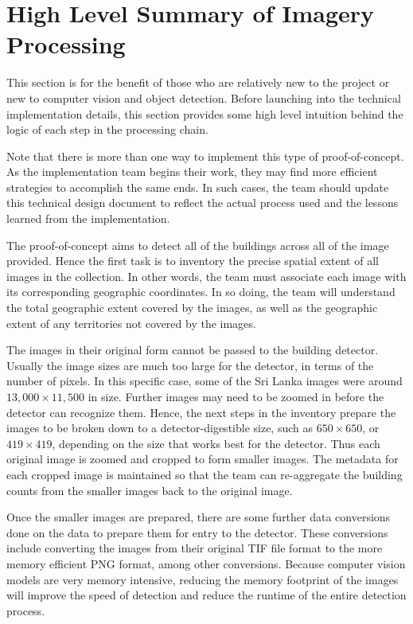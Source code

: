 \documentclass[12pt, a4paper, oneside, headinclude, footinclude]{article}
\begin{document}
\section{High Level Summary of Imagery Processing}
This section is for the benefit of those who are relatively new to the project
or new to computer vision and object detection. Before launching into the
technical implementation details, this section provides some high level
intuition behind the logic of each step in the processing chain.

Note that there is more than one way to implement this type of proof-of-concept.
As the implementation team begins their work, they may find more efficient
strategies to accomplish the same ends. In such cases, the team should update
this technical design document to reflect the actual process used and the
lessons learned from the implementation.

The proof-of-concept aims to detect all of the buildings across all of the image
provided. Hence the first task is to inventory the precise spatial extent of all
images in the collection. In other words, the team must associate each image
with its corresponding geographic coordinates. In so doing, the team will
understand the total geographic extent covered by the images, as well as the
geographic extent of any territories not covered by the images. 

The images in their original form cannot be passed to the building detector.
Usually the image sizes are much too large for the detector, in terms of the
number of pixels.  In this specific case, some of the Sri Lanka images were
around $13,000 \times 11,500$ in size. Further images may need to be zoomed in before the detector
can recognize them. Hence, the next steps in the inventory prepare the images to
be broken down to a detector-digestible size, such as $650 \times 650$, or $419 \times
419$, depending on the size that works best for the detector. Thus each original image is zoomed
and cropped to form smaller images. The metadata for each cropped image is
maintained so that the team can re-aggregate the building counts from the
smaller images back to the original image. 

Once the smaller images are prepared, there are some further data conversions done on the data to prepare them for entry to the detector. These conversions include converting the images from their original TIF file format to the more memory efficient PNG format, among other conversions. Because computer vision models are very memory intensive, reducing the memory footprint of the images will improve the speed of detection and reduce the runtime of the entire detection process. 
\end{document}
